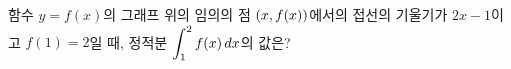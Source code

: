 함수 $y=f(x)$의 그래프 위의 임의의 점 $(x{,}\mkern3mu\mathopen{}f(x))$에서의 접선의 기울기가 $2x-1$이고 $f(1)=2$일 때, 정적분 $\displaystyle\int_{1}^{2} f(x)\mkern3mu dx$의 값은?
